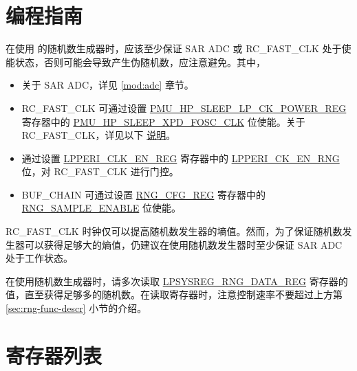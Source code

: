 \documentclass[main\_\_CN.tex]{subfiles}
\begin{document}
\section{编程指南}

在使用 \chipname{} 的随机数生成器时，应该至少保证 SAR ADC 或 RC\_FAST\_CLK 处于使能状态，否则可能会导致产生伪随机数，应注意避免。其中，
\begin{itemize}
    \item 关于 SAR ADC，详见 \ref{mod:adc} \textit{} 章节。
    \item RC\_FAST\_CLK 可通过设置 \hyperref[regdesc:PMUHPSLEEPLPCKPOWERREG]{PMU\_HP\_SLEEP\_LP\_CK\_POWER\_REG} 寄存器中的 \hyperref[fielddesc:PMUHPSLEEPXPDFOSCCLK]{PMU\_HP\_SLEEP\_XPD\_FOSC\_CLK} 位使能。关于 RC\_FAST\_CLK，详见以下 \hyperref[others:rng-note-clock-seed]{说明}。

    \item 通过设置 \hyperref[regdesc:LPPERICLKENREG]{LPPERI\_CLK\_EN\_REG} 寄存器中的 \hyperref[fielddesc:LPPERICKENRNG]{LPPERI\_CK\_EN\_RNG} 位，对 RC\_FAST\_CLK 进行门控。

    \item BUF\_CHAIN 可通过设置 \hyperref[regdesc:RNGCFGREG]{RNG\_CFG\_REG} 寄存器中的 \hyperref[fielddesc:RNGSAMPLEENABLE]{RNG\_SAMPLE\_ENABLE} 位使能。
\end{itemize}
\begin{tiplisting}
    \label{others:rng-note-clock-seed}
    RC\_FAST\_CLK 时钟仅可以提高随机数发生器的墒值。然而，为了保证随机数发生器可以获得足够大的熵值，仍建议在使用随机数发生器时至少保证 SAR ADC 处于工作状态。
\end{tiplisting}

在使用随机数生成器时，请多次读取 \hyperref[regdesc:LPSYSREGRNGDATAREG]{LPSYSREG\_RNG\_DATA\_REG} 寄存器的值，直至获得足够多的随机数。在读取寄存器时，注意控制速率不要超过上方第 \ref{sec:rng-func-descr} 小节的介绍。





\newpage

\hypertarget{rng-reg-summ}{}
\section{寄存器列表}
\label{sec:rng-reg-summ}
\end{document}
